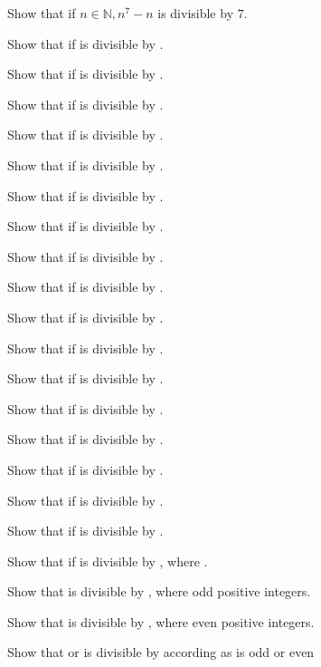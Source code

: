 \item Show that if $n\in\mathbb{N}, n^7 - n$ is divisible by $7$.
\item Show that if  is divisible by .
\item Show that if  is divisible by .
\item Show that if  is divisible by .
\item Show that if  is divisible by .
\item Show that if  is divisible by .
\item Show that if  is divisible by .
\item Show that if  is divisible by .
\item Show that if  is divisible by .
\item Show that if  is divisible by .
\item Show that if  is divisible by .
\item Show that if  is divisible by .
\item Show that if  is divisible by .
\item Show that if  is divisible by .
\item Show that if  is divisible by .
\item Show that if  is divisible by .
\item Show that if  is divisible by .
\item Show that if  is divisible by .
\item Show that if  is divisible by , where .
\item Show that  is divisible by , where  odd positive integers.
\item Show that  is divisible by , where  even positive integers.
\item Show that  or  is divisible by  according as  is odd or even

